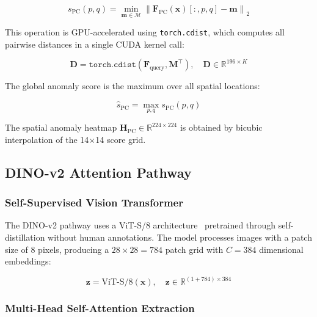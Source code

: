 \documentclass[journal]{IEEEtran}
\begin{document}
\begin{equation}
    s_{\text{PC}}(p, q) = \min_{\mathbf{m} \in \mathcal{M}} \left\| \mathbf{F}_{\text{PC}}(\mathbf{x})[:, p, q] - \mathbf{m} \right\|_2
    \label{eq:dino_score}
\end{equation}

This operation is GPU-accelerated using \texttt{torch.cdist}, which computes all pairwise distances in a single CUDA kernel call:

\begin{equation}
    \mathbf{D} = \texttt{torch.cdist}(\mathbf{F}_{\text{query}}, \mathbf{M}^\top), \quad \mathbf{D} \in \mathbb{R}^{196 \times K}
    \label{eq:cdist}
\end{equation}

The global anomaly score is the maximum over all spatial locations:

\begin{equation}
    \hat{s}_{\text{PC}} = \max_{p,q} s_{\text{PC}}(p, q)
    \label{eq:max_score}
\end{equation}

The spatial anomaly heatmap $\mathbf{H}_{\text{PC}} \in \mathbb{R}^{224 \times 224}$ is obtained by bicubic interpolation of the 14$\times$14 score grid.

\subsection{DINO-v2 Attention Pathway}
\label{sec:dino}

\subsubsection{Self-Supervised Vision Transformer}

The DINO-v2 pathway uses a ViT-S/8 architecture~\cite{caron2021emerging} pretrained through self-distillation without human annotations. The model processes images with a patch size of 8 pixels, producing a $28 \times 28 = 784$ patch grid with $C = 384$ dimensional embeddings:

\begin{equation}
    \mathbf{z} = \text{ViT-S/8}(\mathbf{x}), \quad \mathbf{z} \in \mathbb{R}^{(1+784) \times 384}
    \label{eq:dino_embed}
\end{equation}

\subsubsection{Multi-Head Self-Attention Extraction}
\end{document}
